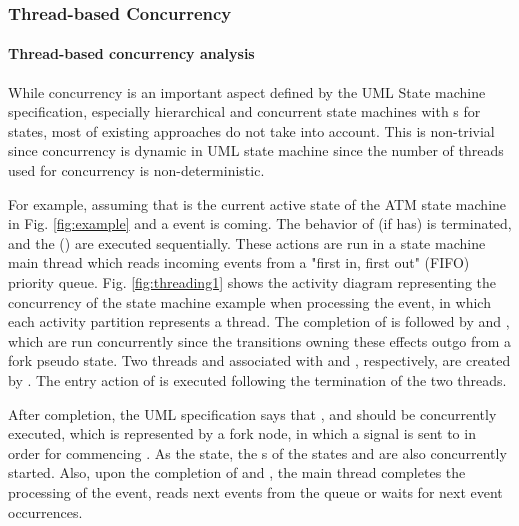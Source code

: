 \subsubsection{Thread-based Concurrency}
\label{subsubsec:thread}
\paragraph{Thread-based concurrency analysis} 

While concurrency is an important aspect defined by the UML State machine specification, especially hierarchical and concurrent state machines with s for states, most of existing approaches do not take into account. This is non-trivial since concurrency is dynamic in UML state machine since the number of threads used for concurrency is non-deterministic.

For example, assuming that  is the current active state of the ATM state machine in Fig. 
\ref{fig:example} and a  event is coming. 
The  behavior of   (if has) is terminated,  and the  () are executed sequentially. 
These actions are run in a state machine main thread which reads incoming events from a "first in, first out" (FIFO) priority queue. 
Fig. \ref{fig:threading1} shows the activity diagram representing the concurrency of the state machine example when processing the  event, in which each activity partition represents a thread. 
The completion of  is followed by  and , which are run concurrently since the transitions owning these effects outgo from a fork pseudo state. 
Two threads  and  associated with  and , respectively, are created by .
The entry action  of  is executed following the termination of the two threads. 

After  completion, the UML specification says that ,  and  should be concurrently executed, which is represented by a fork node, in which a  signal is sent to  in order for commencing . 
As the  state, the s of the states  and  are also concurrently started. 
Also, upon the completion of  and , the main thread completes the processing of the  event, reads next events from the queue or waits for next event occurrences.

